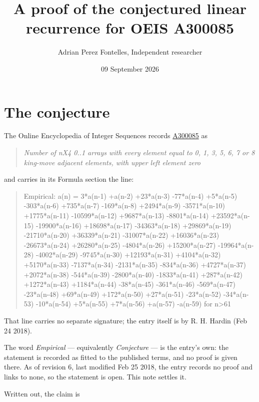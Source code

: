 \documentclass[11pt]{article}
\title{A proof of the conjectured linear recurrence for OEIS A300085}
\author{Adrian Perez Fontelles, Independent researcher}
\date{09 September 2026}
\theoremstyle{definition}
\begin{document}
\maketitle
\section{The conjecture}

The Online Encyclopedia of Integer Sequences records \href{https://oeis.org/A300085}{A300085} as

\begin{quote}\itshape Number of nX4 0..1 arrays with every element equal to 0, 1, 3, 5, 6, 7 or 8 king-move adjacent elements, with upper left element zero\end{quote}

and carries in its Formula section the line:

\begin{quote}\ttfamily Empirical: a(n) = 3*a(n-1) +a(n-2) +23*a(n-3) -77*a(n-4) +5*a(n-5) -303*a(n-6) +735*a(n-7) -169*a(n-8) +2494*a(n-9) -3571*a(n-10) +1775*a(n-11) -10599*a(n-12) +9687*a(n-13) -8801*a(n-14) +23592*a(n-15) -19900*a(n-16) +18698*a(n-17) -34363*a(n-18) +29869*a(n-19) -21710*a(n-20) +36339*a(n-21) -31007*a(n-22) +16036*a(n-23) -26673*a(n-24) +26280*a(n-25) -4804*a(n-26) +15200*a(n-27) -19964*a(n-28) -4002*a(n-29) -9745*a(n-30) +12193*a(n-31) +4104*a(n-32) +5170*a(n-33) -7137*a(n-34) -2131*a(n-35) -834*a(n-36) +4727*a(n-37) +2072*a(n-38) -544*a(n-39) -2800*a(n-40) -1833*a(n-41) +287*a(n-42) +1272*a(n-43) +1184*a(n-44) -38*a(n-45) -361*a(n-46) -569*a(n-47) -23*a(n-48) +69*a(n-49) +172*a(n-50) +27*a(n-51) -23*a(n-52) -34*a(n-53) -10*a(n-54) +5*a(n-55) +7*a(n-56) +a(n-57) -a(n-59) for n>61\end{quote}

That line carries no separate signature; the entry itself is by R. H. Hardin (Feb 24 2018).

The word {\itshape Empirical} --- equivalently {\itshape Conjecture} --- is the entry's own: the statement is recorded as fitted to the published terms, and no proof is given there. As of revision 6, last modified Feb 25 2018, the entry records no proof and links to none, so the statement is open. This note settles it.

Written out, the claim is
\end{document}
